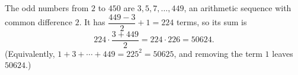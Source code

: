 The odd numbers from $2$ to $450$ are $3,5,7,\dots,449$, an arithmetic sequence with common difference $2$. It has $\dfrac{449-3}{2}+1=224$ terms, so its sum is
\[
224\cdot\dfrac{3+449}{2}=224\cdot226=\boxed{50624}.
\]
(Equivalently, $1+3+\cdots+449=225^2=50625$, and removing the term $1$ leaves $50624$.)
